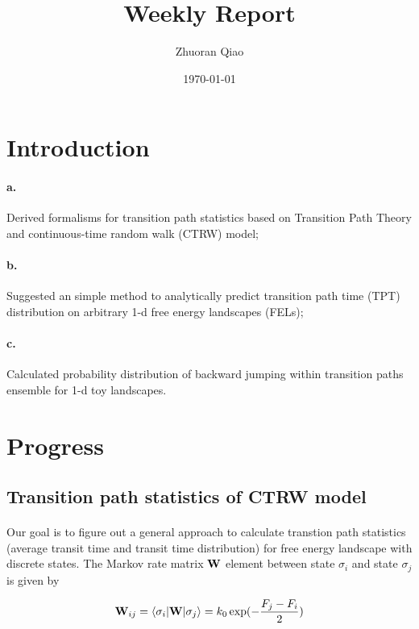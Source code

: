 \documentclass[11pt, a4paper]{article}
\begin{document}
\title{Weekly Report}
\author{Zhuoran Qiao}
\date{\today}

\maketitle

\section{Introduction}
\paragraph{a.} Derived formalisms for transition path statistics based on Transition Path Theory and continuous-time random walk (CTRW) model;
\paragraph{b.} Suggested an simple method to analytically predict transition path time (TPT) distribution on arbitrary 1-d free energy landscapes (FELs);
\paragraph{c.} Calculated probability distribution of backward jumping within transition paths ensemble for 1-d toy landscapes.

\section{Progress}
\subsection{Transition path statistics of CTRW model}

\paragraph{}Our goal is to figure out a general approach to calculate transtion path statistics (average transit time and transit time distribution)
 for free energy landscape with discrete states. The Markov rate matrix $\bold{W}$ element between state $\sigma_i$ and state $\sigma_j$ is given by

 \begin{equation}
   \bold{W}_{ij}=\langle \sigma_i | \bold{W} | \sigma_j \rangle = k_0 \exp(-\frac{F_j-F_i}{2})
 \end{equation}
\end{document}
